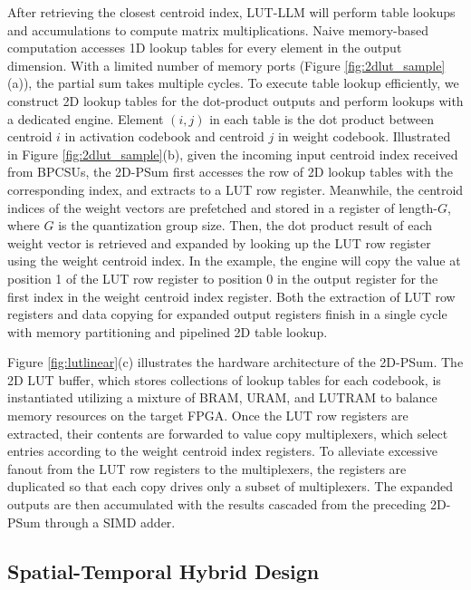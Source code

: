\documentclass[conference]{IEEEtran}
\begin{document}
After retrieving the closest centroid index, LUT-LLM will perform table lookups and accumulations to compute matrix multiplications. 
Naive memory-based computation accesses 1D lookup tables for every element in the output dimension. With a limited number of memory ports (Figure \ref{fig:2dlut_sample}(a)), the partial sum takes multiple cycles. To execute table lookup efficiently, we construct 2D lookup tables for the dot-product outputs and perform lookups with a dedicated engine. Element $(i, j)$ in each table is the dot product between centroid $i$ in activation codebook and centroid $j$ in weight codebook. Illustrated in Figure \ref{fig:2dlut_sample}(b), given the incoming input centroid index received from BPCSUs, the 2D-PSum first accesses the row of 2D lookup tables with the corresponding index, and extracts to a LUT row register. Meanwhile, the centroid indices of the weight vectors are prefetched and stored in a register of length-$G$, where $G$ is the quantization group size. Then, the dot product result of each weight vector is retrieved and expanded by looking up the LUT row register using the weight centroid index. In the example, the engine will copy the value at position 1 of the LUT row register to position 0 in the output register for the first index in the weight centroid index register. Both the extraction of LUT row registers and data copying for expanded output registers finish in a single cycle with memory partitioning and pipelined 2D table lookup.

Figure \ref{fig:lutlinear}(c) illustrates the hardware architecture of the 2D-PSum. The 2D LUT buffer, which stores collections of lookup tables for each codebook, is instantiated utilizing a mixture of BRAM, URAM, and LUTRAM to balance memory resources on the target FPGA. Once the LUT row registers are extracted, their contents are forwarded to value copy multiplexers, which select entries according to the weight centroid index registers. To alleviate excessive fanout from the LUT row registers to the multiplexers, the registers are duplicated so that each copy drives only a subset of multiplexers. The expanded outputs are then accumulated with the results cascaded from the preceding 2D-PSum through a SIMD adder.

\subsection{Spatial-Temporal Hybrid Design}
\end{document}
